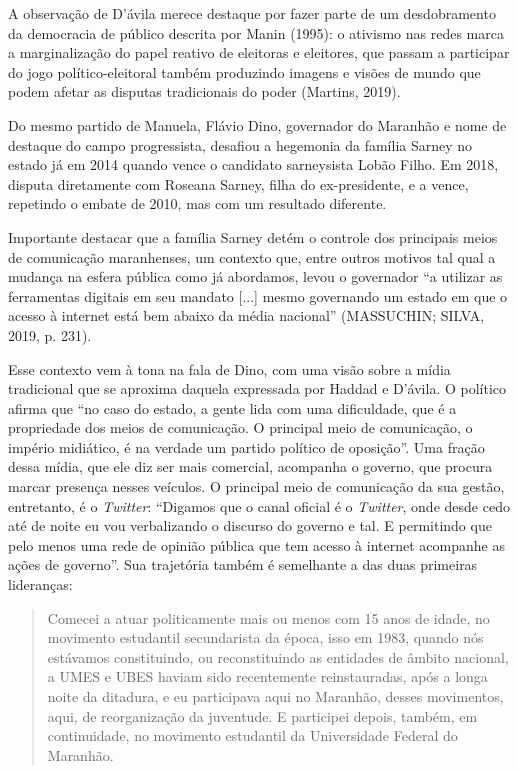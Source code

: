 A observação de D'ávila merece destaque por fazer parte de um
desdobramento da democracia de público descrita por Manin (1995): o
ativismo nas redes marca a marginalização do papel reativo de eleitoras
e eleitores, que passam a participar do jogo político-eleitoral também
produzindo imagens e visões de mundo que podem afetar as disputas
tradicionais do poder (Martins, 2019).

Do mesmo partido de Manuela, Flávio Dino, governador do Maranhão e nome
de destaque do campo progressista, desafiou a hegemonia da família
Sarney no estado já em 2014 quando vence o candidato sarneysista Lobão
Filho. Em 2018, disputa diretamente com Roseana Sarney, filha do
ex-presidente, e a vence, repetindo o embate de 2010, mas com um
resultado diferente.

Importante destacar que a família Sarney detém o controle dos principais
meios de comunicação maranhenses, um contexto que, entre outros motivos
tal qual a mudança na esfera pública como já abordamos, levou o
governador ``a utilizar as ferramentas digitais em seu mandato {[}...{]}
mesmo governando um estado em que o acesso à internet está bem abaixo da
média nacional'' (MASSUCHIN; SILVA, 2019, p. 231).

Esse contexto vem à tona na fala de Dino, com uma visão sobre a mídia
tradicional que se aproxima daquela expressada por Haddad e D'ávila. O
político afirma que ``no caso do estado, a gente lida com uma
dificuldade, que é a propriedade dos meios de comunicação. O principal
meio de comunicação, o império midiático, é na verdade um partido
político de oposição''. Uma fração dessa mídia, que ele diz ser mais
comercial, acompanha o governo, que procura marcar presença nesses
veículos. O principal meio de comunicação da sua gestão, entretanto, é o
\emph{Twitter}: ``Digamos que o canal oficial é o \emph{Twitter}, onde
desde cedo até de noite eu vou verbalizando o discurso do governo e tal.
E permitindo que pelo menos uma rede de opinião pública que tem acesso à
internet acompanhe as ações de governo''. Sua trajetória também é
semelhante a das duas primeiras lideranças:

\begin{quote}
Comecei a atuar politicamente mais ou menos com 15 anos de idade, no
movimento estudantil secundarista da época, isso em 1983, quando nós
estávamos constituindo, ou reconstituindo as entidades de âmbito
nacional, a UMES e UBES haviam sido recentemente reinstauradas, após a
longa noite da ditadura, e eu participava aqui no Maranhão, desses
movimentos, aqui, de reorganização da juventude. E participei depois,
também, em continuidade, no movimento estudantil da Universidade Federal
do Maranhão.
\end{quote}

